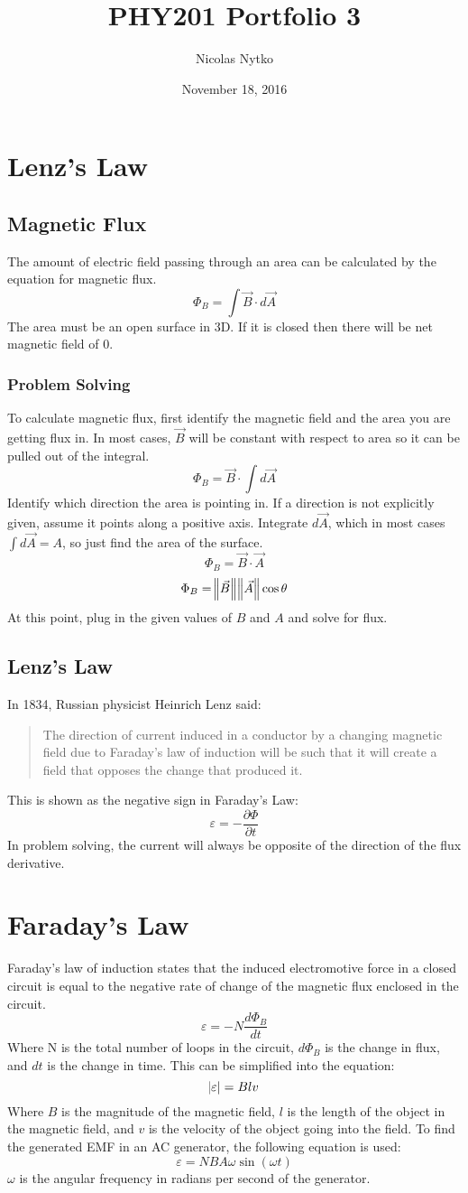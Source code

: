 \documentclass{article}
\title{PHY201 Portfolio 3}
\author{Nicolas Nytko}
\date{November 18, 2016}
\begin{document}
\maketitle
\newpage
\section{Lenz's Law}
\subsection{Magnetic Flux}
The amount of electric field passing through an area can be calculated by the equation for magnetic flux.
\[ \Phi_B = \int \vec{B} \cdot d\vec{A} \]
The area must be an open surface in 3D.  If it is closed then there will be net magnetic field of 0.
\subsubsection{Problem Solving}
To calculate magnetic flux, first identify the magnetic field and the area you are getting flux in.  In most cases, $\vec{B}$ will be constant with respect to area so it can be pulled out of the integral.
\[ \Phi_B = \vec{B} \cdot \int d\vec{A} \]
Identify which direction the area is pointing in.  If a direction is not explicitly given, assume it points along a positive axis.  Integrate $d\vec{A}$, which in most cases $\int d\vec{A} = A$, so just find the area of the surface.
\[ \Phi_B = \vec{B} \cdot \vec{A} \]
\[ \Phi_B = \norm{\vec{B}} \norm{\vec{A}} \cos \theta \]
At this point, plug in the given values of $B$ and $A$ and solve for flux.
\subsection{Lenz's Law}
In 1834, Russian physicist Heinrich Lenz said:
\begin{quote}
{The direction of current induced in a conductor by a changing magnetic field due to Faraday's law of induction will be such that it will create a field that opposes the change that produced it.}
\end{quote}
This is shown as the negative sign in Faraday's Law:
\[ \varepsilon = -\frac{\partial \Phi}{\partial t} \]
In problem solving, the current will always be opposite of the direction of the flux derivative.
\section{Faraday's Law}
Faraday's law of induction states that the induced electromotive force in a closed circuit is equal to the negative rate of change of the magnetic flux enclosed in the circuit.
\[ \varepsilon = -N\frac{d\Phi_B}{dt} \]
Where N is the total number of loops in the circuit, $d\Phi_B$ is the change in flux, and $dt$ is the change in time.  This can be simplified into the equation:
\[ \abs{\varepsilon} = Blv \]
Where $B$ is the magnitude of the magnetic field, $l$ is the length of the object in the magnetic field, and $v$ is the velocity of the object going into the field.
To find the generated EMF in an AC generator, the following equation is used:
\[ \varepsilon = NBA\omega\sin(\omega t) \]
$\omega$ is the angular frequency in radians per second of the generator.
\end{document}
